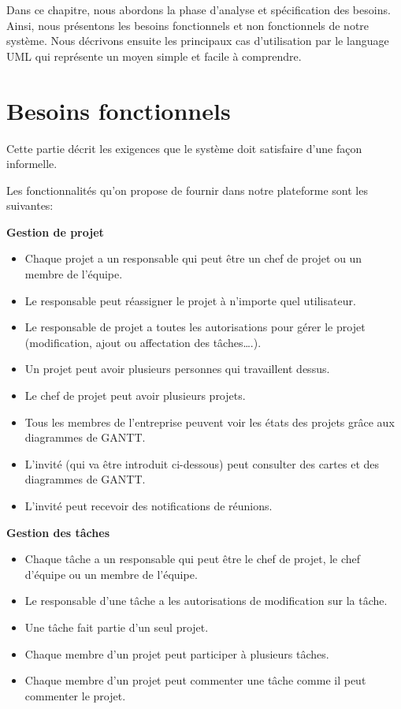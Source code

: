 \hspace{4mm} Dans ce chapitre, nous abordons la phase d’analyse et spécification des besoins. Ainsi, nous présentons les besoins fonctionnels et non fonctionnels de notre système. Nous décrivons ensuite les principaux cas d'utilisation par le language UML qui représente un moyen simple et facile à comprendre.
\section{	Besoins fonctionnels }
\hspace{4mm} Cette partie décrit les exigences que le système doit satisfaire d’une façon informelle. 
\par Les fonctionnalités qu’on propose de fournir dans notre plateforme sont les suivantes:
\par \textbf{Gestion de projet}
\begin{itemize}
    \item	Chaque projet a un responsable qui peut être un chef de projet ou un membre de l’équipe.
    \item 	Le responsable peut réassigner le projet à n’importe quel utilisateur.
    \item Le responsable de projet a toutes les autorisations pour gérer le projet (modification, ajout ou affectation des tâches….).
    \item Un projet peut avoir plusieurs personnes qui travaillent dessus.
    \item Le chef de projet peut avoir plusieurs projets. 
    \item 	Tous les membres de l’entreprise peuvent voir les états des projets grâce aux diagrammes de GANTT.
    \item 	L'invité (qui va être introduit ci-dessous) peut consulter des cartes et des diagrammes de GANTT.
    \item L'invité peut recevoir des notifications de réunions.
\end{itemize}
\par \textbf{Gestion des tâches}
\begin{itemize}
    \item 	Chaque tâche a un responsable qui peut être le chef de projet, le chef d'équipe ou un membre de l’équipe.
    \item 	Le responsable d’une tâche a les autorisations de modification sur la tâche.
    \item 	Une tâche fait partie d’un seul projet.
    \item 	Chaque membre d’un projet peut participer à plusieurs tâches.
    \item Chaque membre d’un projet peut commenter une tâche comme il peut commenter le projet.
\end{itemize}
